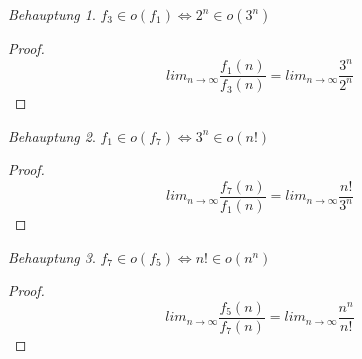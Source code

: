 \documentclass[12pt]{article}
\theoremstyle{remark}
\newtheorem*{Behauptung}{Behauptung}
\begin{document}
\begin{Behauptung}
$f_3 \in o(f_1) \iff 2^n \in o(3^n)$
\end{Behauptung}
\begin{proof}
\[
lim_{n\rightarrow \infty}\frac{f_1(n)}{f_3(n)}
= lim_{n\rightarrow \infty}\frac{3^n}{2^n}

\]
\end{proof}

\begin{Behauptung}
$f_1 \in o(f_7) \iff 3^n \in o(n!)$
\end{Behauptung}
\begin{proof}
\[
lim_{n\rightarrow \infty}\frac{f_7(n)}{f_1(n)}
= lim_{n\rightarrow \infty}\frac{n!}{3^n}

\]
\end{proof}

\begin{Behauptung}
$f_7 \in o(f_5) \iff n! \in o(n^n)$
\end{Behauptung}
\begin{proof}
\[
lim_{n\rightarrow \infty}\frac{f_5(n)}{f_7(n)}
= lim_{n\rightarrow \infty}\frac{n^n}{n!}

\]
\end{proof}
\end{document}
